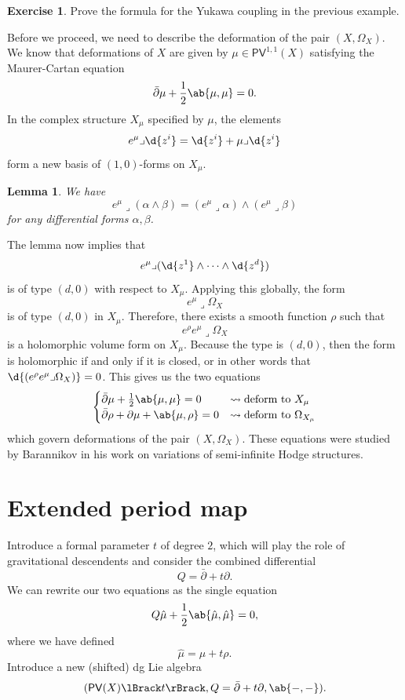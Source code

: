 \documentclass{amsart}
\newtheorem{lem}[thm]{Lemma}
\theoremstyle{definition}
\newtheorem{exer}[thm]{Exercise}
\theoremstyle{remark}
\theoremstyle{plain}
\theoremstyle{definition}
\theoremstyle{remark}
\newcommand{\ms}[1]{\mathsf{#1}}
\newcommand{\1}{\mathbf{1}}
\newcommand{\2}{\mathbf{2}}
\newcommand{\3}{\mathbf{3}}
\newcommand{\ps}[1]{\lBrack #1 \rBrack}
\newcommand{\dbar}{\bar{\partial}}
\begin{document}
\begin{exer}
    Prove the formula for the Yukawa coupling in the previous example.
\end{exer}

Before we proceed, we need to describe the deformation of the pair \((X, \Omega_X)\). We know that deformations of \(X\) are given by \(\mu \in \ms{PV}^{1,1}(X)\) satisfying the Maurer-Cartan equation
\[ \dbar \mu + \frac{1}{2} \ab\{\mu, \mu\}  = 0. \]
In the complex structure \(X_{\mu}\) specified by \(\mu\), the elements
\[ e^{\mu} \lrcorner \d{z^i} = \d{z^i} + \mu \lrcorner \d{z^i} \]
form a new basis of \((1,0)\)-forms on \(X_{\mu}\).

\begin{lem}
    We have
    \[ e^{\mu} \lrcorner (\alpha \wedge \beta) = (e^{\mu} \lrcorner \alpha) \wedge (e^{\mu} \lrcorner \beta) \]
    for any differential forms \(\alpha, \beta\).
\end{lem}

The lemma now implies that 
\[ e^{\mu} \lrcorner (\d{z^1} \wedge \cdots \wedge \d{z^d}) \]
is of type \((d, 0)\) with respect to \(X_{\mu}\). Applying this globally, the form
\[ e^{\mu} \lrcorner \Omega_X \]
is of type \((d, 0)\) in \(X_{\mu}\). Therefore, there exists a smooth function \(\rho\) such that
\[ e^{\rho} e^{\mu} \lrcorner \Omega_X \]
is a holomorphic volume form on \(X_{\mu}\). Because the type is \((d, 0)\), then the form is holomorphic if and only if it is closed, or in other words that \(\d{(e^{\rho} e^{\mu} \lrcorner \Omega_X)} = 0\). This gives us the two equations
\[ \begin{cases}
    \dbar \mu + \frac{1}{2} \ab\{\mu, \mu\} = 0 & \rightsquigarrow \text{deform to } X_{\mu}\\
    \dbar \rho + \partial \mu + \ab\{ \mu, \rho \} = 0 & \rightsquigarrow \text{deform to } \Omega_{X_{\mu}}
\end{cases} \]
which govern deformations of the pair \((X, \Omega_X)\). These equations were studied by Barannikov in his work on variations of semi-infinite Hodge structures.

\section{Extended period map}%
\label{sec:Extended period map}

Introduce a formal parameter \(t\) of degree \(2\), which will play the role of gravitational descendents and consider the combined differential
\[ Q = \dbar + t \partial. \]
We can rewrite our two equations as the single equation
\[ Q \hat{\mu} + \frac{1}{2} \ab\{\hat{\mu}, \hat{\mu}\} = 0, \]
where we have defined
\[ \hat{\mu} = \mu + t \rho. \]
Introduce a new (shifted) dg Lie algebra
\[ (\ms{PV}(X)\ps{t}, Q = \dbar + t \partial, \ab\{-,-\}). \]
\end{document}
